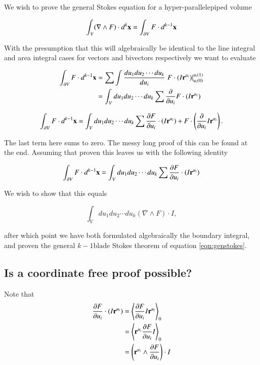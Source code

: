 \documentclass{article}
\newcommand{\grad}[0]{\nabla}
\newcommand{\PD}[2]{\frac{\partial {#2}}{\partial {#1}}}
\newcommand{\gpgrade}[2] {{\left\langle{{#1}}\right\rangle}_{#2}}
\newcommand{\gpgradezero}[1] {\gpgrade{#1}{0}}
\begin{document}
We wish to prove the general Stokes equation for a hyper-parallelepiped volume

\begin{equation}\label{eqn:genstokes}
\int_V (\grad \wedge F) \cdot d^{k}\Bx = \int_{\partial V} F \cdot d^{k-1}\Bx 
\end{equation}

With the presumption that this will algebraically be identical to the line integral and area integral cases for vectors and bivectors respectively
we want to evaluate

\begin{align*}
\int_{\partial V} F \cdot d^{k-1}\Bx 
&= \sum \int \frac{du_1 du_2 \cdots du_k}{du_i} \left.{F \cdot (I \Br^{u_i})}\right\vert_{u_i(0)}^{u_i(1)} \\
&= \int_V du_1 du_2 \cdots du_k \sum \PD{u_i}{} F \cdot (I \Br^{u_i}) \\
\end{align*}

\begin{equation}\label{eqn:toprove}
\int_{\partial V} F \cdot d^{k-1}\Bx 
= \int_V du_1 du_2 \cdots du_k \sum \PD{u_i}{F} \cdot (I \Br^{u_i}) +F \cdot \left( \PD{u_i}{} I \Br^{u_i} \right).
\end{equation}

The last term here sums to zero.  The messy long proof of this can be found at the end.  Assuming that proven this leaves us with the following identity

\begin{equation}\label{eqn:toprove2}
\int_{\partial V} F \cdot d^{k-1}\Bx 
= \int_V du_1 du_2 \cdots du_k \sum \PD{u_i}{F} \cdot (I \Br^{u_i})
\end{equation}

We wish to show that this equals

\begin{equation*}
\int_V du_1 du_2 \cdots du_k (\grad \wedge F) \cdot I,
\end{equation*}

after which point we have both formulated algebraically the boundary integral, and proven the general $k-1\text{blade}$ Stokes theorem of equation \ref{eqn:genstokes}.

\subsection{ Is a coordinate free proof possible? }

Note that
\begin{align*}
\PD{u_i}{F} \cdot (I \Br^{u_i})
&= \gpgradezero{\PD{u_i}{F} I \Br^{u_i}} \\
&= \gpgradezero{ \Br^{u_i} \PD{u_i}{F} I } \\
&= \left(\Br^{u_i} \wedge \PD{u_i}{F} \right) \cdot I \\
\end{align*}
\end{document}
